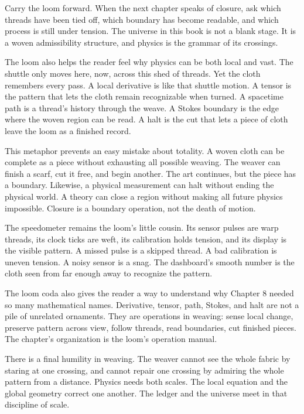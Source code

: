 Carry the loom forward. When the next chapter speaks of closure, ask which
threads have been tied off, which boundary has become readable, and which
process is still under tension. The universe in this book is not a blank stage.
It is a woven admissibility structure, and physics is the grammar of its
crossings.

The loom also helps the reader feel why physics can be both local and vast.
The shuttle only moves here, now, across this shed of threads. Yet the cloth
remembers every pass. A local derivative is like that shuttle motion. A tensor
is the pattern that lets the cloth remain recognizable when turned. A spacetime
path is a thread's history through the weave. A Stokes boundary is the edge
where the woven region can be read. A halt is the cut that lets a piece of
cloth leave the loom as a finished record.

This metaphor prevents an easy mistake about totality. A woven cloth can be
complete as a piece without exhausting all possible weaving. The weaver can
finish a scarf, cut it free, and begin another. The art continues, but the
piece has a boundary. Likewise, a physical measurement can halt without ending
the physical world. A theory can close a region without making all future
physics impossible. Closure is a boundary operation, not the death of motion.

The speedometer remains the loom's little cousin. Its sensor pulses are warp
threads, its clock ticks are weft, its calibration holds tension, and its
display is the visible pattern. A missed pulse is a skipped thread. A bad
calibration is uneven tension. A noisy sensor is a snag. The dashboard's smooth
number is the cloth seen from far enough away to recognize the pattern.

The loom coda also gives the reader a way to understand why Chapter 8 needed so
many mathematical names. Derivative, tensor, path, Stokes, and halt are not a
pile of unrelated ornaments. They are operations in weaving: sense local
change, preserve pattern across view, follow threads, read boundaries, cut
finished pieces. The chapter's organization is the loom's operation manual.

There is a final humility in weaving. The weaver cannot see the whole fabric by
staring at one crossing, and cannot repair one crossing by admiring the whole
pattern from a distance. Physics needs both scales. The local equation and the
global geometry correct one another. The ledger and the universe meet in that
discipline of scale.

